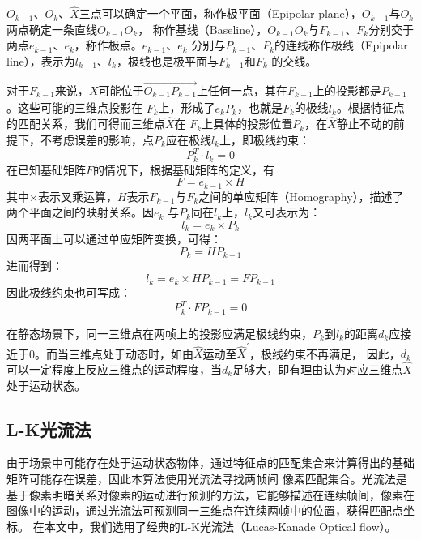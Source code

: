 $O_{k-1}$、$O_{k}$、$\hat{X}$三点可以确定一个平面，称作极平面（Epipolar plane），$O_{k-1}$与$O_{k}$两点确定一条直线$O_{k-1}O_{k}$，
称作基线（Baseline），$O_{k-1}O_{k}$与$F_{k-1}$、$F_{k}$分别交于两点$e_{k-1}$、$e_{k}$，称作极点。$e_{k-1}$、$e_{k}$
分别与$P_{k-1}$、$P_{k}$的连线称作极线（Epipolar line），表示为$l_{k-1}$、$l_{k}$，极线也是极平面与$F_{k-1}$和$F_{k}$
的交线。

对于$F_{k-1}$来说，$X$可能位于$\vec{O_{k-1}P_{k-1}}$上任何一点，其在$F_{k-1}$上的投影都是$P_{k-1}$。这些可能的三维点投影在
$F_{k}$上，形成了$\vec{e_{k}P_{k}}$，也就是$F_{k}$的极线$l_{k}$。根据特征点的匹配关系，我们可得而三维点$\hat{X}$在
$F_{k}$上具体的投影位置$P_{k}$，在$\hat{X}$静止不动的前提下，不考虑误差的影响，点$P_{k}$应在极线$l_{k}$上，即极线约束：
$$P_{k}^{T}·l_{k}=0$$
在已知基础矩阵$F$的情况下，根据基础矩阵的定义\citep{hartley2003multiple}，有
$$F=e_{k-1}\times H$$
其中$\times$表示叉乘运算，$H$表示$F_{k-1}$与$F_{k}$之间的单应矩阵（Homography），描述了两个平面之间的映射关系。因$e_{k}$
与$P_{k}$同在$l_{k}$上，$l_{k}$又可表示为：
$$l_{k}=e_{k}\times P_{k}$$
因两平面上可以通过单应矩阵变换，可得：
$$P_{k}=HP_{k-1}$$
进而得到：
$$l_{k}=e_{k}\times HP_{k-1}=FP_{k-1}$$
因此极线约束也可写成：
$$P_{k}^{T}·FP_{k-1}=0$$

在静态场景下，同一三维点在两帧上的投影应满足极线约束，$P_{k}$到$l_{k}$的距离$d_{k}$应接近于0。而当三维点处于动态时，如由$\hat{X}$运动至${\hat{X}}^{'}$，极线约束不再满足，
因此，$d_{k}$可以一定程度上反应三维点的运动程度，当$d_{k}$足够大，即有理由认为对应三维点$\hat{X}$处于运动状态。

\subsection{L-K光流法}
由于场景中可能存在处于运动状态物体，通过特征点的匹配集合来计算得出的基础矩阵可能存在误差，因此本算法使用光流法寻找两帧间
像素匹配集合。光流法是基于像素明暗关系对像素的运动进行预测的方法，它能够描述在连续帧间，像素在图像中的运动，通过光流法可预测同一三维点在连续两帧中的位置，获得匹配点坐标。
在本文中，我们选用了经典的L-K光流法（Lucas-Kanade Optical flow）\citep{bouguet2001pyramidal}。

